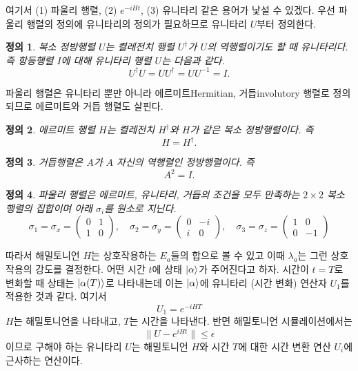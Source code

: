 \documentclass[a4paper,atbegshi,chapter]{oblivoir}
\newtheorem{defn}{정의}[chapter]
\begin{document}
여기서 (1) 파울리 행렬, (2) $e^{-iHt}$, (3) 유니타리
같은 용어가 낯설 수 있겠다. 우선 파울리 행렬의 정의에 유니타리의 정의가 
필요하므로 유니타리 $U$부터 정의한다.
\begin{defn}
  복소 정방행렬 $U$는 켤레전치 행렬 $U^{\dagger}$가 $U$의 역행렬이기도 할 때 
  유니타리다. 즉 항등행렬 $I$에 대해 유니타리 행렬 $U$는 다음과 같다.
  \[
    U^{\dagger}U = UU^{\dagger} = UU^{-1} = I.
  \]
\end{defn}
파울리 행렬은 유니타리 뿐만 아니라 에르미트{\tiny Hermitian},
거듭{\tiny involutory} 행렬로 정의되므로 에르미트와 거듭 행렬도 살핀다.
\begin{defn}
  에르미트 행렬 $H$는 켤레전치 $H^{\dagger}$와 $H$가 같은 복소 정방행렬이다. 즉
  \[
    H = H^{\dagger}.
  \]
\end{defn}
\begin{defn}
  거듭행렬은 $A$가 $A$ 자신의 역행렬인 정방행렬이다. 즉
  \[
    A^2 = I.
  \]
\end{defn}
\begin{defn}
  파울리 행렬은 에르미트, 유니타리, 거듭의 조건을 모두 만족하는
  $2\times2$ 복소행렬의 집합이며 아래 $\sigma_i$를 원소로 지닌다.
  \[
    \sigma_1 = \sigma_x = \begin{pmatrix}0 & 1 \\ 1 & 0\end{pmatrix},\quad
    \sigma_2 = \sigma_y = \begin{pmatrix} 0 & -i \\ i & 0\end{pmatrix},\quad
    \sigma_3 = \sigma_z = \begin{pmatrix}1 & 0 \\ 0 & -1\end{pmatrix}
  \]
\end{defn}
따라서 해밀토니언 $H$는 상호작용하는 $E_a$들의 합으로 볼 수 있고 이때
$\lambda_a$는 그런 상호작용의 강도를 결정한다.
어떤 시간 $t$에 상태 $\ket{\alpha}$가 주어진다고 하자. 시간이 $t=T$로 변화할 때
상태는 $\ket{\alpha(T)}$로 나타내는데 이는 $\ket{\alpha}$에 유니타리 (시간 변화) 
연산자 $U_1$를 적용한 것과 같다. 여기서 
\[
  U_1 = e^{-iHT}
\]
$H$는 해밀토니언을 나타내고, $T$는 시간을 나타낸다. 반면 해밀토니언
시뮬레이션에서는
\[
  \|U-e^{iHt}\|\leq\epsilon
\]
이므로 구해야 하는 유니타리 $U$는 해밀토니언 $H$와 시간 $T$에 대한 시간 변환
연산 $U_i$에 근사하는 연산이다.
\end{document}
